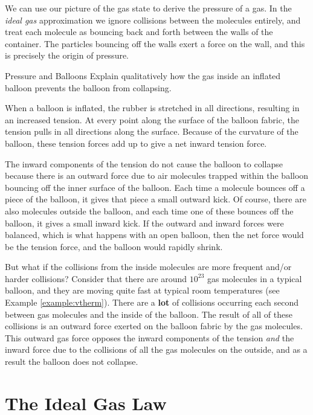 We can use our picture of the gas state to derive the pressure of a
gas.  In the {\it ideal gas} approximation we ignore collisions
between the molecules entirely, and treat each molecule as bouncing
back and forth between the walls of the container.  The particles bouncing
off the walls exert a force on the wall, and this is precisely the 
origin of pressure.

\newpage

\begin{example}{Pressure and Balloons}
  Explain qualitatively how the gas inside an inflated balloon
  prevents the balloon from collapsing.

  \solution When a balloon is inflated, the rubber is stretched in all
  directions, resulting in an increased tension.  At every point along
  the surface of the balloon fabric, the tension pulls in all
  directions along the surface.  Because of the curvature of the
  balloon, these tension forces add up to give a net inward tension
  force.

  The inward components of the tension do not cause the balloon to
  collapse because there is an outward force due to air molecules
  trapped within the balloon bouncing off the inner surface of the
  balloon.  Each time a molecule bounces off a piece of the balloon,
  it gives that piece a small outward kick.  Of course, there are also
  molecules outside the balloon, and each time one of these bounces
  off the balloon, it gives a small inward kick.  If the outward and
  inward forces were balanced, which is what happens with an open
  balloon, then the net force would be the tension force, and the
  balloon would rapidly shrink.

  But what if the collisions from the inside molecules are more
  frequent and/or harder collisions?  Consider that there are
  around $10^{23}$ gas molecules in a typical balloon, and they are
  moving quite fast at typical room temperatures (see Example
  \ref{example:vtherm}).  There are a {\bf lot} of collisions occurring
  each second between gas molecules and the inside of the balloon.
  The result of all of these collisions is an outward force exerted on
  the balloon fabric by the gas molecules.  This outward gas force
  opposes the inward components of the tension {\it and} the inward
  force due to the collisions of all the gas molecules on the outside,
  and as a result the balloon does not collapse.
\end{example}

\section{The Ideal Gas Law}

